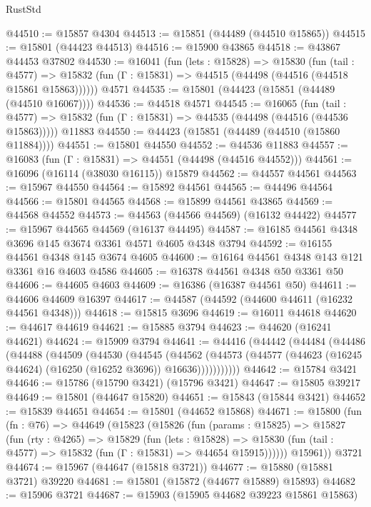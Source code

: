 \begin{lexlean}{RustStd}
\begin{coremodule}
@44510 := @15857 @4304
@44513 := @15851 (@44489 (@44510 @15865))
@44515 := @15801 (@44423 @44513)
@44516 := @15900 @43865
@44518 := @43867 @44453 @37802
@44530 := @16041
    (fun (lets : @15828) =>
    @15830
      (fun (tail : @4577) =>
      @15832 (fun (Γ : @15831) => @44515 (@44498 (@44516 (@44518 @15861 @15863))))))
    @4571
@44535 := @15801 (@44423 (@15851 (@44489 (@44510 @16067))))
@44536 := @44518 @4571
@44545 := @16065
    (fun (tail : @4577) => @15832 (fun (Γ : @15831) => @44535 (@44498 (@44516 (@44536 @15863)))))
    @11883
@44550 := @44423 (@15851 (@44489 (@44510 (@15860 @11884))))
@44551 := @15801 @44550
@44552 := @44536 @11883
@44557 := @16083 (fun (Γ : @15831) => @44551 (@44498 (@44516 @44552)))
@44561 := @16096 (@16114 (@38030 @16115)) @15879
@44562 := @44557 @44561
@44563 := @15967 @44550
@44564 := @15892 @44561
@44565 := @44496 @44564
@44566 := @15801 @44565
@44568 := @15899 @44561 @43865
@44569 := @44568 @44552
@44573 := @44563 (@44566 @44569) (@16132 @44422)
@44577 := @15967 @44565 @44569 (@16137 @44495)
@44587 := @16185 @44561 @4348 @3696 @145 @3674 @3361 @4571 @4605 @4348 @3794
@44592 := @16155 @44561 @4348 @145 @3674 @4605
@44600 := @16164 @44561 @4348 @143 @121 @3361 @16 @4603 @4586
@44605 := @16378 @44561 @4348 @50 @3361 @50
@44606 := @44605 @4603
@44609 := @16386 (@16387 @44561 @50)
@44611 := @44606 @44609 @16397
@44617 := @44587 (@44592 (@44600 @44611 (@16232 @44561 @4348)))
@44618 := @15815 @3696
@44619 := @16011 @44618
@44620 := @44617 @44619
@44621 := @15885 @3794
@44623 := @44620 (@16241 @44621)
@44624 := @15909 @3794
@44641 := @44416
    (@44442
      (@44484
        (@44486
          (@44488
            (@44509
              (@44530
                (@44545
                  (@44562
                    (@44573
                      (@44577 (@44623 (@16245 @44624) (@16250 (@16252 @3696)) @16636)))))))))))
@44642 := @15784 @3421
@44646 := @15786 (@15790 @3421) (@15796 @3421)
@44647 := @15805 @39217
@44649 := @15801 (@44647 @15820)
@44651 := @15843 (@15844 @3421)
@44652 := @15839 @44651
@44654 := @15801 (@44652 @15868)
@44671 := @15800
    (fun (fn : @76) =>
    @44649
      (@15823
        (@15826
          (fun (params : @15825) =>
          @15827
            (fun (rty : @4265) =>
            @15829
              (fun (lets : @15828) =>
              @15830 (fun (tail : @4577) => @15832 (fun (Γ : @15831) => @44654 @15915))))))
        @15961))
    @3721
@44674 := @15967 (@44647 (@15818 @3721))
@44677 := @15880 (@15881 @3721) @39220
@44681 := @15801 (@15872 (@44677 @15889) @15893)
@44682 := @15906 @3721
@44687 := @15903 (@15905 @44682 @39223 @15861 @15863)

\end{coremodule}
\end{lexlean}
